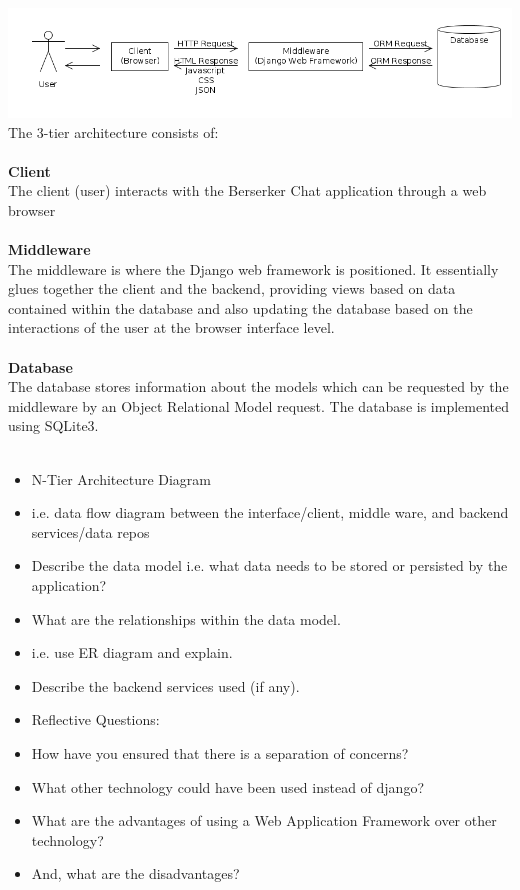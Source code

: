 \documentclass{sig-alt-release2}
\begin{document}
\includegraphics[scale=0.29]{n-tier-arch.png} \\
The 3-tier architecture consists of: \\\\ 
\textbf{Client} \\
The client (user) interacts with the Berserker Chat application through a web browser\\ \\
\textbf{Middleware} \\
The middleware is where the Django web framework is positioned. It essentially glues together the client and the backend, providing views based on data contained within the database and also updating the database based on the interactions of the user at the browser interface level.\\ \\
\textbf{Database} \\
The database stores information about the models which can be requested by the middleware by an Object Relational Model request. The database is implemented using SQLite3.\\ \\

\begin{itemize}
\item	N-Tier Architecture Diagram %
\item	i.e. data flow diagram between the interface/client, middle ware, and backend services/data repos %
\item	Describe the data model i.e. what data needs to be stored or persisted by the application? %
\item	What are the relationships within the data model. %
\item	i.e. use ER diagram and explain. %
\item	Describe the backend services used (if any). %
\item	Reflective Questions: 
\item	How have you ensured that there is a separation of concerns? %
\item	What other technology could have been used instead of django? %
\item	What are the advantages of using a Web Application Framework over other technology? %
\item	And, what are the disadvantages? %
\end{itemize}
\end{document}
